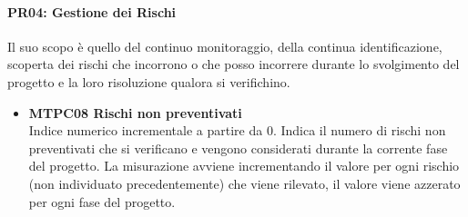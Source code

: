 \paragraph{PR04: Gestione dei Rischi}
Il suo scopo è quello del continuo monitoraggio, della continua identificazione, scoperta dei rischi che incorrono o che posso incorrere durante lo svolgimento del progetto e la loro risoluzione qualora si verifichino.
\begin{itemize}

\item \textbf{MTPC08 Rischi non preventivati}\-\\
Indice numerico incrementale a partire da 0. Indica il numero di rischi non preventivati che si verificano e vengono considerati durante la corrente fase del progetto. La misurazione avviene incrementando il valore per ogni rischio (non individuato precedentemente) che viene rilevato, il valore viene azzerato per ogni fase del progetto.

\end{itemize}

